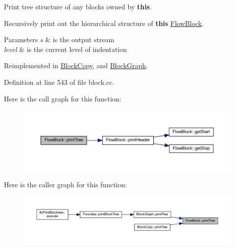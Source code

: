 Print tree structure of any blocks owned by {\bfseries{this}}. 

Recursively print out the hierarchical structure of {\bfseries{this}} \mbox{\hyperlink{class_flow_block}{Flow\+Block}}. 
\begin{DoxyParams}{Parameters}
{\em s} & is the output stream \\
\hline
{\em level} & is the current level of indentation \\
\hline
\end{DoxyParams}


Reimplemented in \mbox{\hyperlink{class_block_copy_ac44129ef866b5e09769f7962c1da928c}{Block\+Copy}}, and \mbox{\hyperlink{class_block_graph_add1908219c53b2687c4d1c6c9132c11e}{Block\+Graph}}.



Definition at line 543 of file block.\+cc.

Here is the call graph for this function\+:
\nopagebreak
\begin{figure}[H]
\begin{center}
\leavevmode
\includegraphics[width=350pt]{class_flow_block_ae00f14fc1916599ec34074fbb010c74b_cgraph}
\end{center}
\end{figure}
Here is the caller graph for this function\+:
\nopagebreak
\begin{figure}[H]
\begin{center}
\leavevmode
\includegraphics[width=350pt]{class_flow_block_ae00f14fc1916599ec34074fbb010c74b_icgraph}
\end{center}
\end{figure}
\mbox{\label{class_flow_block_a002ddc14dc84098dcb14b513f8b973c1}} 
